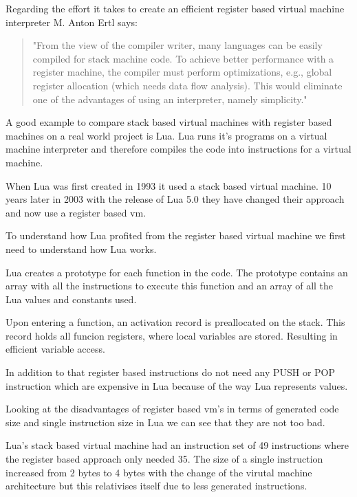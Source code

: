 \documentclass{article}
\begin{document}
Regarding the effort it takes to create an efficient register based virtual
machine interpreter M. Anton Ertl says:

\begin{quotation}
"From the view of the compiler writer, many languages can be easily compiled for
stack machine code. To achieve better performance with a register machine, the
compiler must perform optimizations, e.g., global register allocation (which
needs data flow analysis). This would eliminate one of the advantages of using an
interpreter, namely simplicity." ~\cite{stack_caching_for_interpreters}
\end{quotation}

A good example to compare stack based virtual machines with register based
machines on a real world project is Lua. Lua runs it's programs on a virtual
machine interpreter and therefore compiles the code into instructions for a
virtual machine.

When Lua was first created in 1993 it used a stack based virtual machine. 10
years later in 2003 with the release of Lua 5.0 they have changed their
approach and now use a register based vm. ~\cite{lua_implementation}

To understand how Lua profited from the register based virtual machine we first
need to understand how Lua works.

Lua creates a prototype for each function in the code. The prototype contains an
array with all the instructions to execute this function and an array of all the
Lua values and constants used. ~\cite{lua_implementation}

Upon entering a function, an activation record is preallocated on the stack.
This record holds all funcion registers, where local variables are stored.
Resulting in efficient variable access. ~\cite{lua_implementation}

In addition to that register based instructions do not need any PUSH or POP
instruction which are expensive in Lua because of the way Lua represents
values.

Looking at the disadvantages of register based vm's in terms of generated code
size and single instruction size in Lua we can see that they are not too bad.

Lua's stack based virtual machine had an instruction set of 49 instructions
where the register based approach only needed 35. The size of a single
instruction increased from 2 bytes to 4 bytes with the change of the virutal
machine architecture but this relativises itself due to less generated
instructions.
\end{document}
